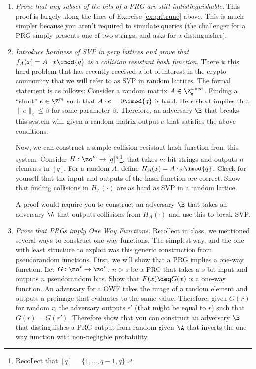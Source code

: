 \documentclass[A4, 11pt]{article}
\begin{document}
\begin{enumerate}
\item {\it Prove that any subset of the bits of a PRG are still
indistinguishable.} This proof is largely along the lines of Exercise
\ref{ex:prftrunc} above. This is much simpler because you aren't required
to simulate queries (the challenger for a PRG simply presents one of two
strings, and asks for a distinguisher).

\item {\it Introduce hardness of SVP in perp lattices and prove that
$f_A(x)=A\cdot x \imod{q}$ is a collision resistant hash function.} There
is this hard problem that has recently received a lot of interest in the
crypto community that we will refer to as SVP in random lattices. The
formal statement is as follows: Consider a random matrix $A \in \Z_q^{n
\times m}$. Finding a ``short'' $e \in \Z^m$ such that $A \cdot e = 0
\imod{q}$ is hard. Here short implies that $\|e\|_2 \leq \beta$ for some
parameter $\beta$. Therefore, an adversary $\B$ that breaks this system
will, given a random matrix output $e$ that satisfies the above conditions. 

Now, we can construct a simple collision-resistant hash function from this
system. Consider $H:\zo^m \rightarrow [q]^n$\footnote{Recollect that
$[q]=\{1,\ldots,q-1,q\}$.}, that takes $m$-bit strings and outputs $n$
elements in $[q]$. For a random $A$, define $H_A(x) = A\cdot x \imod{q}$.
Check for yourself that the input and outputs of the hash function are
correct. Show that finding collisions in $H_A(\cdot)$ are as hard as SVP in
a random lattice.

A proof would require you to construct an adversary $\B$ that takes an
adversary $\A$ that outputs collisions from $H_A(\cdot)$ and use this to
break SVP. 

\item {\it Prove that PRGs imply One Way Functions.} Recollect in class, we
mentioned several ways to construct one-way functions. The simplest way,
and the one with least structure to exploit was this generic construction
from pseudorandom functions. First, we will show that a PRG implies a
one-way function. Let $G:\zo^s \rightarrow \zo^n$, $n>s$ be a PRG that
takes a $s$-bit input and outputs $n$ pseudorandom bits. Show that
$F(x)\deq G(x)$ is a one-way function. An adversary for a OWF takes the
image of a random element and outputs a preimage that evaluates to the same
value. Therefore, given $G(r)$ for random $r$, the adversary outputs $r'$
(that might be equal to $r$) such that $G(r)=G(r')$. Therefore show that
you can construct an adversary $\B$ that distinguishes a PRG output from
random given $\A$ that inverts the one-way function with non-negligble
probability.


\end{enumerate}
\end{document}
